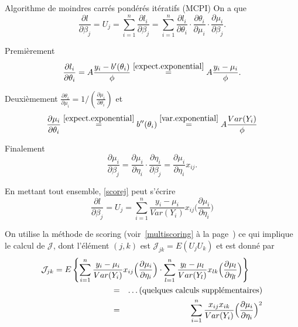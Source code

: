 \documentclass{BeamerTemplate}
\begin{document}
\begin{refsection}
\begin{frame}{Algorithme de moindres carrés pondérés itératifs (MCPI)}
On a que
\begin{equation}
\label{scorej}
\frac{\partial l}{\partial \beta_j} = U_j = \sum_{i=1}^n
  \frac{\partial l_i}{\partial
  \beta_j} = \sum_{i=1}^n \frac{\partial l_i}{\partial \theta_i} \cdot
  \frac{\partial \theta_i}{\partial \mu_i} \cdot \frac{\partial
  \mu_i}{\partial \beta_j}.
\end{equation}
\end{frame}

\begin{frame}{}
Premièrement
$$\frac{\partial l_i}{\partial \theta_i} = A \frac{y_i -
b^{\prime}(\theta_i)}{\phi} \stackrel{\eqref{expect.exponential}}{=}
 A \frac{y_i-\mu_i}{\phi}.$$

\bigskip

Deuxièmement $\frac{\partial \theta_i}{\partial \mu_i} = 1/(\frac{\partial
  \mu_i}{\partial \theta_i})$
et
$$\frac{\partial \mu_i}{\partial \theta_i}
\stackrel{\eqref{expect.exponential}}{=} b^{\prime \prime}(\theta_i)
\stackrel{\eqref{var.exponential}}{=} A \frac{Var(Y_i)}{\phi}$$

\bigskip
Finalement
$$\frac{\partial \mu_i}{\partial \beta_j}=
\frac{\partial \mu_i}{\partial \eta_i} \cdot \frac{\partial
  \eta_i}{\partial\beta_j} = \frac{\partial \mu_i}{\partial \eta_i}
x_{ij}.$$

\bigskip

En mettant tout ensemble, \eqref{scorej} peut s'écrire
$$\frac{\partial l}{\partial \beta_j} = U_j = \sum_{i=1}^n
\frac{y_i-\mu_i}{Var(Y_i)} x_{ij} \Big(\frac{\partial \mu_i}{\partial
  \eta_i}\Big)$$
\label{EE.GLM}
\end{frame}

\begin{frame}{}
On utilise la méthode de scoring (voir~\eqref{multiscoring} à la page~\pageref{multiscoring})  ce qui implique
le calcul de ${\mathcal J}$, dont
l'élément $(j,k)$ est ${\mathcal J}_{jk} = E(U_j U_k)$ et est donné par
\begin{eqnarray*}
  \lefteqn{{\mathcal J}_{jk} = E \left\{ \sum_{i=1}^n
\frac{y_i-\mu_i}{Var(Y_i)} x_{ij} \Big(\frac{\partial \mu_i}{\partial
  \eta_i}\Big) \cdot \sum_{l=1}^n
\frac{y_l-\mu_l}{Var(Y_l)} x_{lk} \Big(\frac{\partial \mu_l}{\partial
  \eta_l}\Big) \right\}} \hspace*{3cm}\\
& = & \ldots (\mbox{quelques calculs supplémentaires})\\
& = &  \sum_{i=1}^n \frac{x_{ij} x_{ik}}{Var(Y_i)}
\Big(\frac{\partial \mu_i}{\partial
  \eta_i}\Big)^2
\end{eqnarray*}


\end{frame}
\end{refsection}
\end{document}
